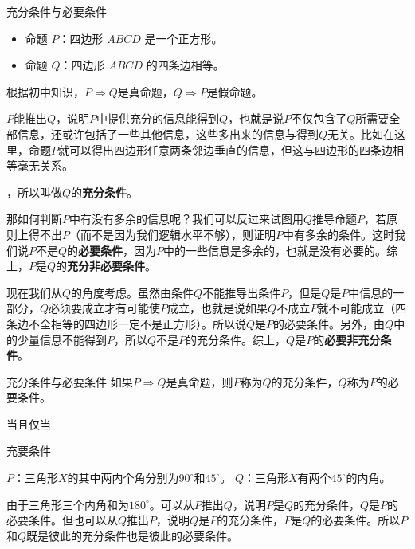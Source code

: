 \begin{example}{充分条件与必要条件}

\begin{itemize}
\item 命题 $P$：四边形 $ABCD$ 是一个正方形。
\item 命题 $Q$：四边形 $ABCD$ 的四条边相等。
\end{itemize}

根据初中知识，$P\Rightarrow Q$是真命题，$Q\Rightarrow P$是假命题。

$P$能推出$Q$，说明$P$中提供充分的信息能得到$Q$，也就是说$P$不仅包含了$Q$所需要全部信息，还或许包括了一些其他信息，这些多出来的信息与得到$Q$无关。比如在这里，命题$P$就可以得出四边形任意两条邻边垂直的信息，但这与四边形的四条边相等毫无关系。

，所以叫做$Q$的\textbf{充分条件}。

那如何判断$P$中有没有多余的信息呢？我们可以反过来试图用$Q$推导命题$P$，若原则上得不出$P$（而不是因为我们逻辑水平不够），则证明$P$中有多余的条件。这时我们说$P$不是$Q$的\textbf{必要条件}，因为$P$中的一些信息是多余的，也就是没有必要的。综上，$P$是$Q$的\textbf{充分非必要条件}。

现在我们从$Q$的角度考虑。虽然由条件$Q$不能推导出条件$P$，但是$Q$是$P$中信息的一部分，$Q$必须要成立才有可能使$P$成立，也就是说如果$Q$不成立$P$就不可能成立（四条边不全相等的四边形一定不是正方形）。所以说$Q$是$P$的必要条件。另外，由$Q$中的少量信息不能得到$P$，所以$Q$不是$P$的充分条件。综上，$Q$是$P$的\textbf{必要非充分条件}。

\end{example}

\begin{definition}{充分条件与必要条件}
如果$P\Rightarrow Q$是真命题，则$P$称为$Q$的充分条件，$Q$称为$P$的必要条件。
\end{definition}

当且仅当




\begin{example}{充要条件}
\begin{itemize}
$P$：三角形$X$的其中两内个角分别为$90^\circ$和$45^\circ$。
$Q$：三角形$X$有两个$45^\circ$的内角。
\end{itemize}

由于三角形三个内角和为$180^\circ$。可以从$P$推出$Q$，说明$P$是$Q$的充分条件，$Q$是$P$的必要条件。但也可以从$Q$推出$P$，说明$Q$是$P$的充分条件，$P$是$Q$的必要条件。所以$P$和$Q$既是彼此的充分条件也是彼此的必要条件。
\end{example}

